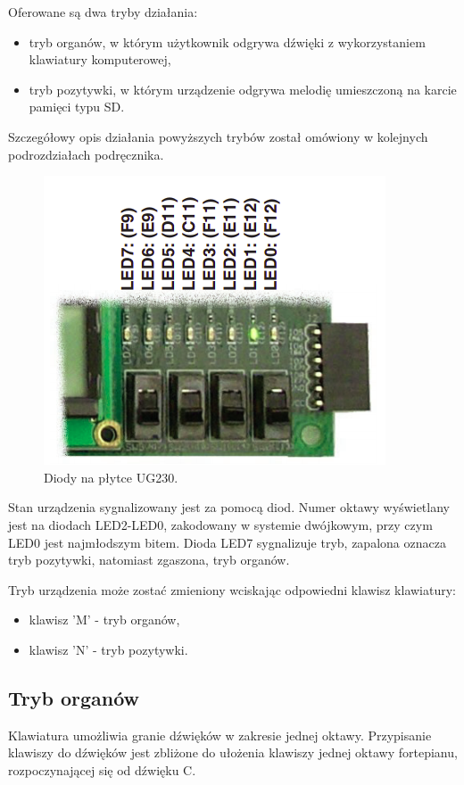 \documentclass[a4paper,12pt]{article}
\begin{document}
Oferowane są dwa tryby działania: 
\begin{itemize}
  \item tryb organów, w którym użytkownik odgrywa dźwięki z wykorzystaniem klawiatury komputerowej,
  \item tryb pozytywki, w którym urządzenie odgrywa melodię umieszczoną na karcie pamięci typu SD.
\end{itemize}
 
Szczegółowy opis działania powyższych trybów został omówiony w kolejnych podrozdziałach podręcznika.

\begin{figure}[h]
  \centering
  \includegraphics[width=0.6\linewidth]{images/discrete_leds.png}
  \caption{Diody na płytce UG230\cite{web:ug230}.}
  \label{led_mapping}
\end{figure}

Stan urządzenia sygnalizowany jest za pomocą diod. Numer oktawy wyświetlany jest na diodach LED2-LED0, zakodowany w systemie dwójkowym, przy czym LED0 jest najmłodszym bitem. Dioda LED7 sygnalizuje tryb, zapalona oznacza tryb pozytywki, natomiast zgaszona, tryb organów. 

Tryb urządzenia może zostać zmieniony wciskając odpowiedni klawisz klawiatury:
\begin{itemize}
  \item klawisz 'M' - tryb organów,
  \item klawisz 'N' - tryb pozytywki.
\end{itemize}

\subsection{Tryb organów}

Klawiatura umożliwia granie dźwięków w zakresie jednej oktawy. 
Przypisanie klawiszy do dźwięków jest zbliżone do ułożenia klawiszy jednej oktawy fortepianu, rozpoczynającej się od dźwięku C.
\end{document}
